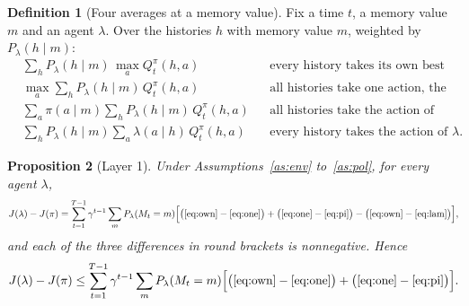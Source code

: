 \documentclass{article}
\newtheorem{proposition}{Proposition}[section]
\theoremstyle{definition}
\newtheorem{definition}[proposition]{Definition}
\numberwithin{equation}{section}
\begin{document}
\begin{definition}[Four averages at a memory value]\label{def:four}
Fix a time $t$, a memory value $m$ and an agent $\lambda$. Over the histories $h$ with memory value $m$, weighted by $P_\lambda(h\mid m)$:
\begin{align}
&\sum_hP_\lambda(h\mid m)\,\max_aQ^\pi_t(h,a) &&\text{every history takes its own best action,} \label{eq:own}\\
&\max_a\sum_hP_\lambda(h\mid m)\,Q^\pi_t(h,a) &&\text{all histories take one action, the best on average,} \label{eq:one}\\
&\sum_a\pi(a\mid m)\sum_hP_\lambda(h\mid m)\,Q^\pi_t(h,a) &&\text{all histories take the action of our policy,} \label{eq:pi}\\
&\sum_hP_\lambda(h\mid m)\sum_a\lambda(a\mid h)\,Q^\pi_t(h,a) &&\text{every history takes the action of $\lambda$.} \label{eq:lam}
\end{align}
\end{definition}

\begin{proposition}[Layer 1]\label{prop:layer1}
Under Assumptions~\ref{as:env} to~\ref{as:pol}, for every agent $\lambda$,
\[
J(\lambda)-J(\pi)=\sum_{t=1}^{T-1}\gamma^{t-1}\sum_mP_\lambda(M_t=m)\Big[\big(\eqref{eq:own}-\eqref{eq:one}\big)+\big(\eqref{eq:one}-\eqref{eq:pi}\big)-\big(\eqref{eq:own}-\eqref{eq:lam}\big)\Big],
\]
and each of the three differences in round brackets is nonnegative. Hence
\[
J(\lambda)-J(\pi)\le\sum_{t=1}^{T-1}\gamma^{t-1}\sum_mP_\lambda(M_t=m)\Big[\big(\eqref{eq:own}-\eqref{eq:one}\big)+\big(\eqref{eq:one}-\eqref{eq:pi}\big)\Big].
\]
\end{proposition}
\end{document}
